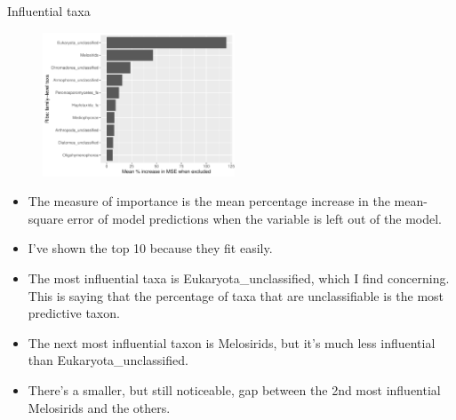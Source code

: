 \documentclass{beamer}
\begin{document}
\begin{frame}{Influential taxa}

  \begin{center}
    \begin{figure}
      \includegraphics[width=2.25in]{w_ribs/families_rib_PercIncMSE_barchart}
    \end{figure}
  \end{center}
  
  \vspace{0.1in}
  
  {\scriptsize
    \begin{itemize}
    \item The measure of importance is the mean percentage increase in
      the mean-square error of model predictions when the variable is
      left out of the model.
    \item I've shown the top 10 because they fit easily.
    \item The most influential taxa is Eukaryota\_unclassified, which I find
    concerning.  This is saying that the percentage of taxa that are
    unclassifiable is the most predictive taxon.
    \item The next most influential taxon is Melosirids, but it's much less
    influential than Eukaryota\_unclassified.
    \item There's a smaller, but still noticeable, gap
      between the 2nd most influential Melosirids and the others.
    \end{itemize}
  }

\end{frame}
\end{document}
